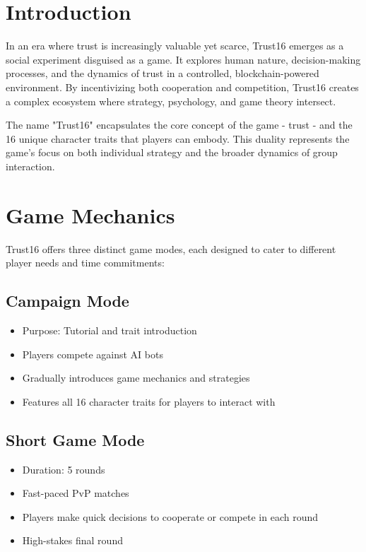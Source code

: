\documentclass[12pt,a4paper]{article}
\begin{document}
\section{Introduction}

In an era where trust is increasingly valuable yet scarce, Trust16 emerges as a social experiment disguised as a game. It explores human nature, decision-making processes, and the dynamics of trust in a controlled, blockchain-powered environment. By incentivizing both cooperation and competition, Trust16 creates a complex ecosystem where strategy, psychology, and game theory intersect.

The name "Trust16" encapsulates the core concept of the game - trust - and the 16 unique character traits that players can embody. This duality represents the game's focus on both individual strategy and the broader dynamics of group interaction.

\section{Game Mechanics}

Trust16 offers three distinct game modes, each designed to cater to different player needs and time commitments:

\subsection{Campaign Mode}
\begin{itemize}
    \item Purpose: Tutorial and trait introduction
    \item Players compete against AI bots
    \item Gradually introduces game mechanics and strategies
    \item Features all 16 character traits for players to interact with
\end{itemize}

\subsection{Short Game Mode}
\begin{itemize}
    \item Duration: 5 rounds
    \item Fast-paced PvP matches
    \item Players make quick decisions to cooperate or compete in each round
    \item High-stakes final round
\end{itemize}
\end{document}
